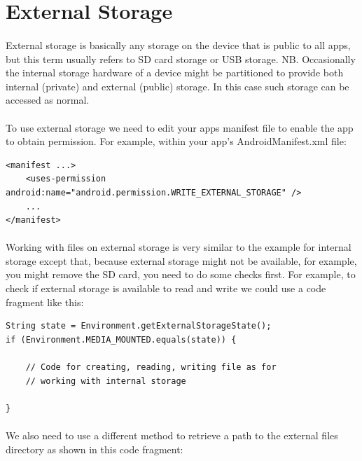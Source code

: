\section{External Storage}
\paragraph{} External storage is basically any storage on the device that is public to all apps, but this term usually refers to SD card storage or USB storage. NB. Occasionally the internal storage hardware of a device might be partitioned to provide both internal (private) and external (public) storage. In this case such storage can be accessed as normal.

\paragraph{} To use external storage we need to edit your apps manifest file to enable the app to obtain permission. For example, within your app's AndroidManifest.xml file:

\begin{lstlisting}
<manifest ...>
    <uses-permission android:name="android.permission.WRITE_EXTERNAL_STORAGE" />
    ...
</manifest>
\end{lstlisting}

\paragraph{} Working with files on external storage is very similar to the example for internal storage except that, because external storage might not be available, for example, you might remove the SD card, you need to do some checks first. For example, to check if external storage is available to read and write we could use a code fragment like this:

\begin{lstlisting}
String state = Environment.getExternalStorageState();
if (Environment.MEDIA_MOUNTED.equals(state)) {
    
    // Code for creating, reading, writing file as for
    // working with internal storage

}
\end{lstlisting}

\paragraph{} We also need to use a different method to retrieve a path to the external files directory as shown in this code fragment:

